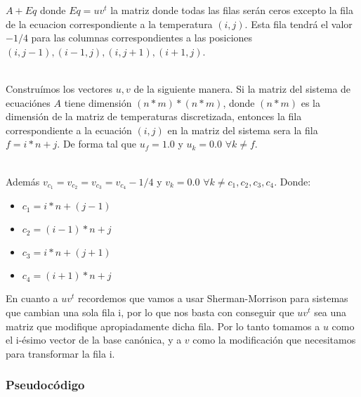 $ A + Eq $ donde $Eq = uv^{t} $ la matriz donde todas las filas ser\'an ceros excepto la fila de la ecuacion correspondiente a la temperatura $(i, j)$. Esta fila tendr\'a el valor $-1/4$ para las columnas correspondientes a las posiciones $(i,j-1),(i-1,j), (i,j+1), (i+1,j) $.\\\

Constru\'imos los vectores $u, v$ de la siguiente manera. Si la matriz del sistema de ecuaci\'ones $A$ tiene dimensi\'on $(n*m)*(n*m)$, donde $(n*m)$ es la dimensi\'on de la matriz de temperaturas discretizada, entonces la fila correspondiente a la ecuaci\'on $(i,j)$ en la matriz del sistema sera la fila $f = i*n + j$. De forma tal que $u_{f} = 1.0$ y $u_{k} = 0.0$ $ \forall k \neq f$.\\\

Adem\'as $v_{c_{1}} = v_{c_{2}} = v_{c_{3}} = v_{c_{4}} -1/4$ y  $v_{k} = 0.0$ $ \forall k \neq c_{1},c_{2},c_{3},c_{4}$. Donde: \\
\begin{itemize}
\item $c_{1} = i*n + (j-1)$
\item $c_{2} = (i-1)*n + j$
\item $c_{3} = i*n + (j+1)$
\item $c_{4} = (i+1)*n + j$
\end{itemize}


En cuanto a $ uv^{t} $ recordemos que vamos a usar Sherman-Morrison para sistemas que cambian una sola fila i, por lo que nos basta con
conseguir que $ uv^{t} $ sea una matriz que modifique apropiadamente dicha fila. Por lo tanto tomamos a $u$ como el i-ésimo vector de la base canónica,
y a $v$ como la modificación que necesitamos para transformar la fila i.

\subsubsection{Pseudocódigo}


